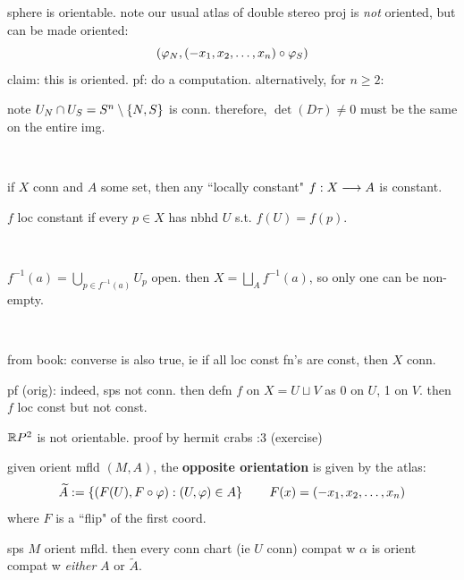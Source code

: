 \begin{xmp}[source=Primary Source Material]
    sphere is orientable.
	note our usual atlas of double stereo proj is \textit{not} oriented,
	but can be made oriented:
	\begin{equation*}
		(\varphi_{N},(-x_{1},x_{2},\dots,x_{n})\circ\varphi_{S})
	\end{equation*}
	claim: this is oriented.
	pf: do a computation. alternatively, for $n\geq2$:

	note $U_{N}\cap U_{S}=S^{n}\setminus\left\{{N,S}\right\}$ is conn.
	therefore, $\det(D\tau)\neq0$ must be the same on the entire img.
\end{xmp} \

\begin{lm}
    if $X$ conn and $A$ some set, then
	any ``locally constant" $f:X\longrightarrow A$ is constant.

	$f$ loc constant if every $p\in X$ has nbhd $U$ s.t. $f(U)=f(p)$.
\end{lm} \

\begin{pf}[source=Primary Source Material]
    $f^{-1}(a)=\bigcup_{p\in f^{-1}(a)}U_{p}$ open.
	then $X=\bigsqcup_{A}f^{-1}(a)$, so only one can be non-empty.
\end{pf} \

from book: converse is also true, ie if all loc const fn's are const, then
$X$ conn.

pf (orig):
indeed, sps not conn. then defn $f$ on $X=U\sqcup V$ as 0 on $U$, 1 on $V$.
then $f$ loc const but not const.

\begin{exr}[source=Primary Source Material]
    $\mathbb{R} P^{2}$ is not orientable.
	proof by hermit crabs :3 (exercise)
\end{exr}

\begin{defn}
    given orient mfld $(M,A)$, the \textbf{opposite orientation}
	is given by the atlas:
	\begin{equation*}
	    \widetilde{A}:=\left\{{(F(U),F\circ\varphi):(U,\varphi)\in A}\right\} \qquad
		F(x) = (-x_{1},x_{2},\dots,x_{n})
	\end{equation*}
	where $F$ is a ``flip" of the first coord.
\end{defn}

\begin{prop}
    sps $M$ orient mfld.
	then every conn chart (ie $U$ conn) compat w $\alpha$ is
	orient compat w \textit{either} $A$ or $\tilde{A}$.
\end{prop} \

